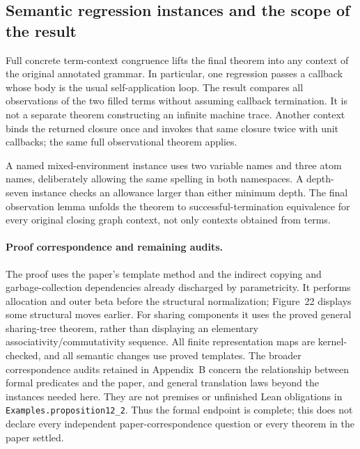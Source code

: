 \subsection{Semantic regression instances and the scope of the result}
Full concrete term-context congruence lifts the final theorem into any
context of the original annotated grammar. In particular, one regression
passes a callback whose body is the usual self-application loop. The result
compares all observations of the two filled terms without assuming callback
termination. It is not a separate theorem constructing an infinite machine
trace. Another context binds the returned closure once and invokes that same
closure twice with unit callbacks; the same full observational theorem applies.

A named mixed-environment instance uses two variable names and three atom
names, deliberately allowing the same spelling in both namespaces. A depth-seven
instance checks an allowance larger than either minimum depth. The final
observation lemma unfolds the theorem to successful-termination equivalence
for every original closing graph context, not only contexts obtained from terms.

\paragraph{Proof correspondence and remaining audits.}
The proof uses the paper's template method and the indirect copying and
garbage-collection dependencies already discharged by parametricity. It
performs allocation and outer beta before the structural normalization;
Figure~22 displays some structural moves earlier. For sharing components it
uses the proved general sharing-tree theorem, rather than displaying an
elementary associativity/commutativity sequence. All finite representation
maps are kernel-checked, and all semantic changes use proved templates.
The broader correspondence audits retained in Appendix~B concern the
relationship between formal predicates and the paper, and general translation
laws beyond the instances needed here. They are not premises or unfinished
Lean obligations in \texttt{Examples.proposition12\_2}. Thus the formal
endpoint is complete; this does not declare every independent paper-correspondence
question or every theorem in the paper settled.
